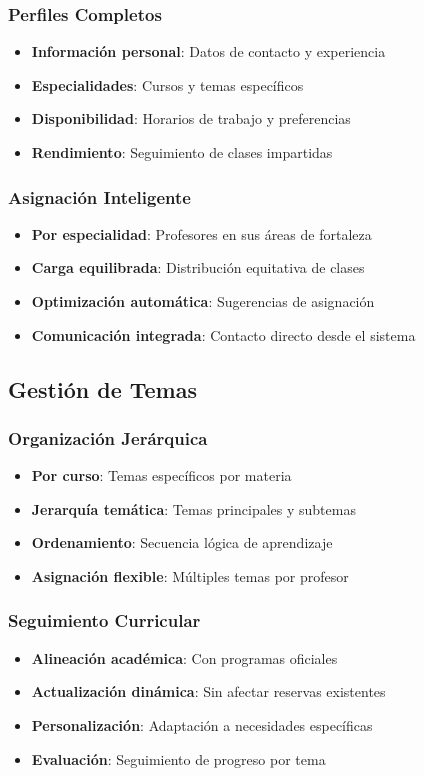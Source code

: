 \documentclass[12pt,a4paper]{article}
\begin{document}
\subsubsection{Perfiles Completos}
\begin{itemize}
    \item \textbf{Información personal}: Datos de contacto y experiencia
    \item \textbf{Especialidades}: Cursos y temas específicos
    \item \textbf{Disponibilidad}: Horarios de trabajo y preferencias
    \item \textbf{Rendimiento}: Seguimiento de clases impartidas
\end{itemize}

\subsubsection{Asignación Inteligente}
\begin{itemize}
    \item \textbf{Por especialidad}: Profesores en sus áreas de fortaleza
    \item \textbf{Carga equilibrada}: Distribución equitativa de clases
    \item \textbf{Optimización automática}: Sugerencias de asignación
    \item \textbf{Comunicación integrada}: Contacto directo desde el sistema
\end{itemize}

\subsection{Gestión de Temas}

\subsubsection{Organización Jerárquica}
\begin{itemize}
    \item \textbf{Por curso}: Temas específicos por materia
    \item \textbf{Jerarquía temática}: Temas principales y subtemas
    \item \textbf{Ordenamiento}: Secuencia lógica de aprendizaje
    \item \textbf{Asignación flexible}: Múltiples temas por profesor
\end{itemize}

\subsubsection{Seguimiento Curricular}
\begin{itemize}
    \item \textbf{Alineación académica}: Con programas oficiales
    \item \textbf{Actualización dinámica}: Sin afectar reservas existentes
    \item \textbf{Personalización}: Adaptación a necesidades específicas
    \item \textbf{Evaluación}: Seguimiento de progreso por tema
\end{itemize}
\end{document}
